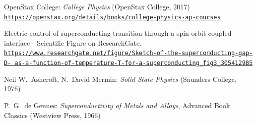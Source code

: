 \documentclass[a4paper,12pt,titlepage]{article}
\begin{document}
\begin{thebibliography}{}

OpenStax College: \emph{College Physics} (OpenStax College, 2017) \\
\href{https://openstax.org/details/books/college-physics-ap-courses}{\texttt{https://openstax.org/details/books/college-physics-ap-courses}}

Electric control of superconducting transition through a spin-orbit coupled interface - Scientific Figure on ResearchGate. \newline
\href{https://www.researchgate.net/figure/Sketch-of-the-superconducting-gap-D-as-a-function-of-temperature-T-for-a-superconducting_fig3_305412985}{\texttt{https://www.researchgate.net/figure/Sketch-of-the-superconducting-gap-D- as-a-function-of-temperature-T-for-a-superconducting\_fig3\_305412985}}

Neil W.\ Ashcroft, N.\ David Mermin: \emph{Solid State Physics} (Saunders College, 1976)

P.\ G.\ de Gennes: \emph{Superconductivity of Metals and Alloys}, Advanced Book Classics \newline (Westview Press, 1966)

\end{thebibliography}
\end{document}
